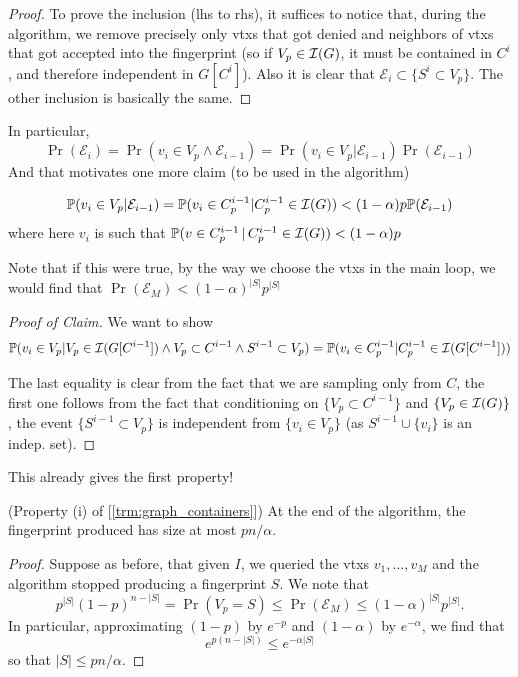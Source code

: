 \begin{proof}
	To prove the inclusion (lhs to rhs), it suffices to notice that,
	during the algorithm, we remove precisely only vtxs that got denied
	and neighbors of vtxs that got accepted into the fingerprint (so if
		$V_p \in \mathcal{I}(G)$, it must be contained in $C^i$, and
	therefore independent in $G[C^i]$).
	Also it is clear that $\mathcal{E}_i \subset \{S^i \subset V_p\}$.
	The other inclusion is basically the same.
\end{proof}
In particular,
\[
	\Pr(\mathcal{E}_i) = \Pr(v_i \in V_p \land \mathcal{E}_{i-1}) =
	\Pr(v_i \in V_p | \mathcal{E}_{i-1}) \Pr(\mathcal{E}_{i-1})
\]
And that motivates one more claim (to be used in the algorithm)
\begin{claim}
	\[
		\mathbb{P}(v_i \in V_p | \mathcal{E}_{i-1}) = \mathbb{P}(v_i \in C^{i-1}_p |
		C^{i-1}_p \in \mathcal{I}(G)) < (1-\alpha)p \mathbb{P}(\mathcal{E}_{i-1})
	\]
	where here $v_i$ is such that $\mathbb{P}(v \in C^{i-1}_p\, |\, C^{i-1}_p
	\in \mathcal{I}(G)) < (1-\alpha)p$
\end{claim}

Note that if this were true, by the way we choose the vtxs in the
main loop, we would find that $\Pr(\mathcal{E}_M) < (1-\alpha)^{|S|}p^{|S|}$

\begin{proof}[Proof of Claim]
	We want to show
	\[
		\mathbb{P}(v_i \in V_p | V_p \in \mathcal{I}(G[C^{i-1}]) \land V_p
		\subset C^{i-1} \land S^{i-1} \subset V_p) = \mathbb{P}(v_i \in C^{i-1}_p
		| C^{i-1}_p \in \mathcal{I}(G[C^{i-1}]))
	\]

	The last equality is clear from the fact that we are sampling only
	from $C$, the first one follows from
	the fact that conditioning on $\{V_p \subset C^{i-1}\}$ and
	$\{V_p \in \mathcal{I}(G)\}$, the event  $\{S^{i-1} \subset V_p\}$ is
	independent from $\{v_i \in
	V_p\}$ (as $S^{i-1} \cup \{v_i\}$ is an indep. set).
\end{proof}

This already gives the first property!
\begin{claim}
	(Property (i) of [\ref{trm:graph_containers}]) At the end of the
	algorithm, the fingerprint produced has size at most $pn/\alpha$.
\end{claim}
\begin{proof}
	Suppose as before, that given $I$, we queried the vtxs $v_1, \dots,
	v_M$ and the algorithm stopped producing
	a fingerprint $S$.
	We note that
	\[
		p^{|S|}(1-p)^{n - |S|} = \Pr(V_p = S) \leq \Pr(\mathcal{E}_M) \leq
		(1-\alpha)^{|S|}p^{|S|}.
	\]
	In particular, approximating $(1-p)$ by $e^{-p}$ and $(1-\alpha)$ by
	$e^{-\alpha}$,
	we find that
	\[e^{p(n - |S|)} \leq e^{-\alpha|S|}\]
	so that $|S| \leq pn/\alpha$.
\end{proof}

